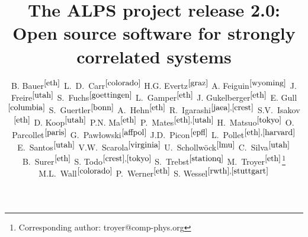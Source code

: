 \documentclass[12pt]{iopart}
\begin{document}
\lstset{language=Python,basicstyle=\scriptsize,numbers=left,stepnumber=5,numberfirstline=true}

\title{The ALPS project release 2.0: \\ Open source software for strongly correlated systems}

\newcommand{\myauthor}[3]{#2$^{#1}$}
\newcommand{\myaddress}[2]{\address{\refstepcounter{affiliation} $^{\arabic{affiliation}}$#2 \label{#1}}}

\author{
	\myauthor{\ref{eth}}{B. Bauer}{bauerb@phys.ethz.ch}
	\myauthor{\ref{colorado}}{L.~D.~Carr}{lcarr@mines.edu}
	\myauthor{\ref{graz}}{H.G. Evertz}{evertz@tugraz.at}
	\myauthor{\ref{wyoming}}{A. Feiguin}{afeiguin@uwyo.edu}
	\myauthor{\ref{utah}}{J. Freire}{juliana@cs.utah.edu}
	\myauthor{\ref{goettingen}}{S.~Fuchs}{fuchs@theorie.physik.uni-goettingen.de}
	\myauthor{\ref{eth}}{L.~Gamper}{gamperl@gmail.com}
	\myauthor{\ref{eth}}{J. Gukelberger}{gukelberger@phys.ethz.ch}
	\myauthor{\ref{columbia}}{E. Gull}{gull@phys.columbia.edu}
	\myauthor{\ref{bonn}}{S.~Guertler}{guertler@th.physik.uni-bonn.de}
	\myauthor{\ref{eth}}{A.~Hehn}{hehn@phys.ethz.ch}
	\myauthor{\ref{jaea},\ref{crest}}{R.~Igarashi}{rigarash@hosi.phys.s.u-tokyo.ac.jp}
	\myauthor{\ref{eth}}{S.V.~Isakov}{isakov@phys.ethz.ch}
	\myauthor{\ref{utah}}{D. Koop}{dakoop@cs.utah.edu}
	\myauthor{\ref{eth}}{P.N. Ma}{pingnang@phys.ethz.ch}
	\myauthor{\ref{eth},\ref{utah}}{P.~Mates}{mates@sci.utah.edu}
	\myauthor{\ref{tokyo}}{H.~Matsuo}{halm@looper.t.u-tokyo.ac.jp}
	\myauthor{\ref{paris}}{O. Parcollet}{parcolle@spht.saclay.cea.fr}
	\myauthor{\ref{affpol}}{G.~Paw{\l}owski}{gpawlo@amu.edu.pl}
	\myauthor{\ref{epfl}}{J.D.~Picon}{jean-david.picon@epfl.chl}
	\myauthor{\ref{eth},\ref{harvard}}{L.~Pollet}{pollet@phys.ethz.ch}
	\myauthor{\ref{utah}}{E.~Santos}{emanuele@sci.utah.edu}
	\myauthor{\ref{virginia}}{V.W.~Scarola}{scarola@vt.edu}
	\myauthor{\ref{lmu}}{U.~Schollw\"ock}{schollwoeck@lmu.de}
	\myauthor{\ref{utah}}{C.~Silva}{csilva@sci.utah.edu}
	\myauthor{\ref{eth}}{B.~Surer}{surerb@phys.ethz.ch}
	\myauthor{\ref{crest},\ref{tokyo}}{S. Todo}{wistaria@ap.t.u-tokyo.ac.jp}
	\myauthor{\ref{stationq}}{S.~Trebst}{trebst@kitp.ucsb.edu}
	\myauthor{\ref{eth}}{M.~Troyer}{troyer@ethz.ch}\footnote{Corresponding author: troyer@comp-phys.org}
	\myauthor{\ref{colorado}}{M.L.~Wall}{mwall@mymail.mines.edu}
	\myauthor{\ref{eth}}{P.~Werner}{werner@phys.ethz.ch}
	\myauthor{\ref{rwth},\ref{stuttgart}}{S. Wessel}{wessel@phys.ethz.ch}
}
\end{document}
